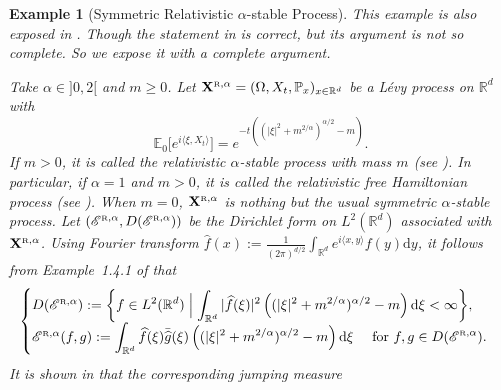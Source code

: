 \documentclass[12pt,a4paper]{article}
\newtheorem{example}[thm]{Example}
\renewcommand{\P}{\mathbb{P}}
\newcommand{\E}{\mathbb{E}}
\newcommand{\R}{\mathbb{R}}
\renewcommand{\d}{\mathrm{d}}
\newcommand{\1}{{\bf 1}}
\newcommand{\wh}{\widehat}
\renewcommand{\wh}{\widehat}
\begin{document}
\begin{example}[Symmetric Relativistic $\alpha$-stable Process]\label{ex:relastable}
\rm
 This example is also exposed in \cite[Example~4.1]{CK}. 
Though the statement in \cite[Example~4.1]{CK} is correct, but its 
argument is not so complete. So we expose it with a complete argument.     

Take $\alpha\in]0,2[$ and $m\geq0$.
Let ${\bf X}^{\text{\tiny\rm R},\alpha}=(\Omega,X_t,\P_x)_{x\in\R^d}$ be a
L\'evy process on $\R^d$ with
  \[ \E_{0}\bigl[e^{i \langle  \xi, X_{t}  \rangle}\bigr]=
e^{-t((|\xi|^2+m^{2/\alpha })^{\alpha/2}-m)}.\]
If $m>0$, it is called the \emph{relativistic $\alpha$-stable process with mass $m$} (see \cite{Ryz:relativisticstable}).
In particular, if $\alpha=1$ and $m>0$, it is called the \emph{relativistic free Hamiltonian process} (see \cite{HS:PP}).
When $m=0$, ${\bf X}^{\text{\tiny\rm R},\alpha}$ is nothing but the usual \emph{symmetric
$\alpha$-stable process}.
Let $(\mathscr{E}^{\text{\tiny\rm R},\alpha},
D(\mathscr{E}^{\text{\tiny\rm R},\alpha}))$
be the Dirichlet form on $L^2(\R^d)$ associated with 
${\bf X}^{\text{\tiny\rm R},\alpha}$.
Using Fourier transform $\wh{f}(x):=\frac{1}{(2\pi)^{d/2}}\int_{\R^d}e^{i\langle x,y\rangle}f(y){\d} y$, it follows
from Example~1.4.1 of \cite{FOT} that
\begin{align*}
\begin{cases}
D(\mathscr{E}^{\text{\tiny\rm R},\alpha}) :=\displaystyle{\left\{f\in L^2(\R^d)\;\Bigl|\; \int_{\R^d}
|\wh{f}(\xi)|^2\left((|\xi|^2+m^{2/\alpha})^{\alpha/2} -m \right){\d}\xi<\infty  \right\}},
 \\
\mathscr{E}^{\text{\tiny\rm R},\alpha}(f,g) :=\displaystyle{\int_{\R^d}
\wh{f}(\xi)\bar{\wh{g}}(\xi)\left((|\xi|^2+m^{2/\alpha})^{\alpha/2} -m \right){\d}\xi \quad\text{ for }f,g\in D(\mathscr{E}^{\text{\tiny\rm R},\alpha}}).
\end{cases}
\end{align*}
It is shown in \cite{CS3} that the corresponding jumping measure

\end{example}
\end{document}

